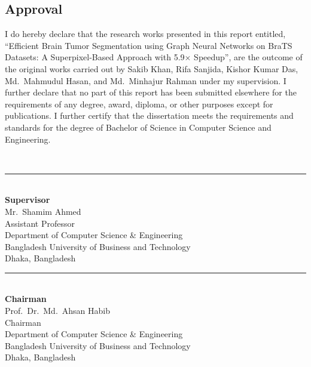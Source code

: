 \documentclass{article}
\begin{document}
\begin{center}
    \section*{Approval}
\end{center}

I do hereby declare that the research works presented in this report entitled,
``Efficient Brain Tumor Segmentation using Graph Neural Networks on BraTS Datasets:
A Superpixel-Based Approach with 5.9$\times$ Speedup'', are the outcome of the
original works carried out by Sakib Khan, Rifa Sanjida, Kishor Kumar Das,
Md.\ Mahmudul Hasan, and Md.\ Minhajur Rahman under my supervision. I further
declare that no part of this report has been submitted elsewhere for the requirements
of any degree, award, diploma, or other purposes except for publications. I further
certify that the dissertation meets the requirements and standards for the degree of
Bachelor of Science in Computer Science and Engineering.

\vspace{6mm}

\null\hfill\\
\noindent\rule{9.3cm}{0.2pt} \\
\textbf{Supervisor}\\
Mr.\ Shamim Ahmed \\
Assistant Professor \\
Department of Computer Science \& Engineering \\
Bangladesh University of Business and Technology\\
Dhaka, Bangladesh

\vspace{16mm}

\begin{flushleft}
\nopagebreak
\noindent\rule{9.3cm}{0.2pt} \\
\nopagebreak
\textbf{Chairman} \null\hfill \\
\nopagebreak
Prof.\ Dr.\ Md.\ Ahsan Habib \\
\nopagebreak
Chairman \\
\nopagebreak
Department of Computer Science \& Engineering \\
\nopagebreak
Bangladesh University of Business and Technology\\
\nopagebreak
Dhaka, Bangladesh\\
\end{flushleft}
\cleardoublepage
\end{document}
